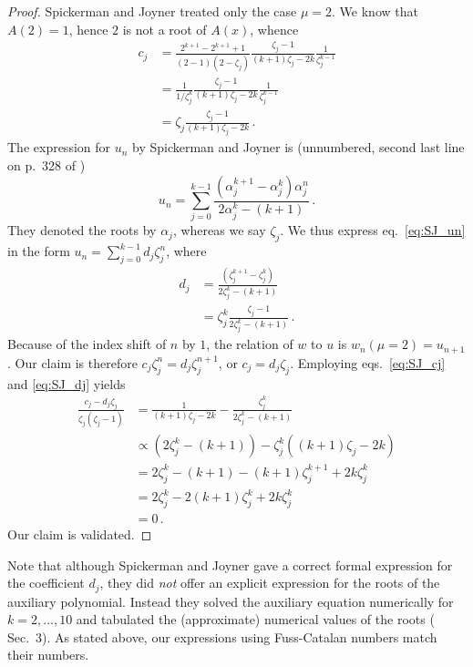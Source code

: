 \documentclass[review]{elsarticle}
\theoremstyle{plain}
\begin{document}
\begin{proof}  
Spickerman and Joyner treated only the case $\mu=2$.
We know that $A(2)=1$, hence $2$ is not a root of $A(x)$, whence
\begin{equation}
\label{eq:SJ_cj}
\begin{split}
  c_j &= \frac{2^{k+1}-2^{k+1}+1}{(2-1)(2-\zeta_j)} \frac{\zeta_j-1}{(k+1)\zeta_j-2k}\frac{1}{\zeta_j^{k-1}}
  \\
  &= \frac{1}{1/\zeta_j^k} \frac{\zeta_j-1}{(k+1)\zeta_j-2k}\frac{1}{\zeta_j^{k-1}}
  \\
  &= \zeta_j \frac{\zeta_j-1}{(k+1)\zeta_j-2k} \,.
\end{split}
\end{equation}
The expression for $u_n$ by Spickerman and Joyner is (unnumbered, second last line on p.~328 of \cite{SpickermanJoyner})
\begin{equation}
\label{eq:SJ_un}
u_n = \sum_{j=0}^{k-1} \frac{(\alpha_j^{k+1}-\alpha_j^k)\alpha_j^n}{2\alpha_j^k - (k+1)} \,.
\end{equation}
They denoted the roots by $\alpha_j$, whereas we say $\zeta_j$.
We thus express eq.~\eqref{eq:SJ_un} in the form $u_n = \sum_{j=0}^{k-1}d_j\zeta_j^n$, where
\begin{equation}
\label{eq:SJ_dj}
\begin{split}
d_j &= \frac{(\zeta_j^{k+1}-\zeta_j^k)}{2\zeta_j^k - (k+1)} 
\\
&= \zeta_j^k \frac{\zeta_j-1}{2\zeta_j^k - (k+1)} \,. 
\end{split}
\end{equation}
Because of the index shift of $n$ by $1$, the relation of $w$ to $u$ is $w_n(\mu=2) = u_{n+1}$.
Our claim is therefore $c_j\zeta_j^n = d_j\zeta_j^{n+1}$, or $c_j = d_j\zeta_j$.
Employing eqs.~\eqref{eq:SJ_cj} and \eqref{eq:SJ_dj} yields
\begin{equation}
\begin{split}
  \frac{c_j-d_j\zeta_j}{\zeta_j(\zeta_j-1)} &= \frac{1}{(k+1)\zeta_j-2k} - \frac{\zeta_j^k}{2\zeta_j^k-(k+1)}
  \\
  &\propto (2\zeta_j^k-(k+1)) - \zeta_j^k((k+1)\zeta_j-2k)
  \\
  &= 2\zeta_j^k-(k+1) - (k+1)\zeta_j^{k+1}+2k\zeta_j^k
  \\
  &= 2\zeta_j^k-2(k+1)\zeta_j^k+2k\zeta_j^k
  \\
  &= 0 \,.
\end{split}
\end{equation}
Our claim is validated.
\end{proof}  
Note that although Spickerman and Joyner \cite{SpickermanJoyner} gave a correct formal expression for the coefficient $d_j$,
they did \emph{not} offer an explicit expression for the roots of the auxiliary polynomial.
Instead they solved the auxiliary equation numerically for $k=2,\dots,10$ and tabulated the (approximate) numerical values of the roots (\cite{SpickermanJoyner} Sec.~3).
As stated above, our expressions using Fuss-Catalan numbers match their numbers.
\end{document}
